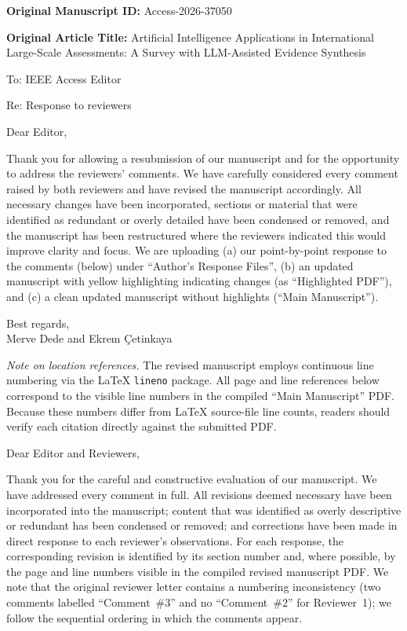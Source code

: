 \documentclass[12pt, a4paper]{article}
\begin{document}

\noindent
\textbf{Original Manuscript ID:} Access-2026-37050

\medskip
\noindent
\textbf{Original Article Title:} Artificial Intelligence Applications in International Large-Scale
Assessments: A Survey with LLM-Assisted Evidence Synthesis

\bigskip
\noindent
To: IEEE Access Editor

\medskip
\noindent
Re: Response to reviewers

\bigskip
\noindent
Dear Editor,

\medskip
Thank you for allowing a resubmission of our manuscript and for the opportunity to address the
reviewers' comments. We have carefully considered every comment raised by both reviewers and have
revised the manuscript accordingly. All necessary changes have been incorporated, sections or
material that were identified as redundant or overly detailed have been condensed or removed, and
the manuscript has been restructured where the reviewers indicated this would improve clarity and
focus. We are uploading (a) our point-by-point response to the comments (below) under
``Author's Response Files'', (b) an updated manuscript with yellow highlighting indicating
changes (as ``Highlighted PDF''), and (c) a clean updated manuscript without highlights
(``Main Manuscript'').

\medskip
\noindent
Best regards,\\[6pt]
Merve Dede and Ekrem \c{C}etinkaya

\bigskip
\noindent\textit{Note on location references.} The revised manuscript employs continuous line
numbering via the \LaTeX{} \texttt{lineno} package. All page and line references below correspond
to the visible line numbers in the compiled ``Main Manuscript'' PDF. Because these numbers differ
from LaTeX source-file line counts, readers should verify each citation directly against the
submitted PDF.

\newpage


\noindent Dear Editor and Reviewers,

\medskip
Thank you for the careful and constructive evaluation of our manuscript. We have addressed every
comment in full. All revisions deemed necessary have been incorporated into the manuscript;
content that was identified as overly descriptive or redundant has been condensed or removed;
and corrections have been made in direct response to each reviewer's observations. For each
response, the corresponding revision is identified by its section number and, where possible,
by the page and line numbers visible in the compiled revised manuscript PDF. We note that the
original reviewer letter contains a numbering inconsistency (two comments labelled
``Comment~\#3'' and no ``Comment~\#2'' for Reviewer~1); we follow the sequential ordering in
which the comments appear.
\end{document}
